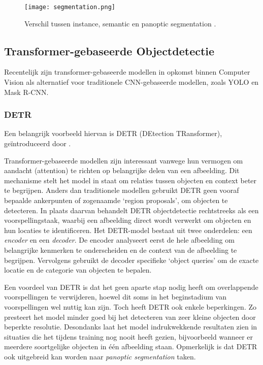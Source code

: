 \begin{figure}[H]
  \centering
  \texttt{[image: segmentation.png]}
  \caption[]{\label{fig:segmentation}
  Verschil tussen instance, semantic en panoptic segmentation \autocite{Kirillov2019}.
  }
\end{figure}

\subsection{Transformer-gebaseerde Objectdetectie}

Recentelijk zijn transformer-gebaseerde modellen in opkomst binnen Computer Vision als alternatief voor traditionele CNN-gebaseerde modellen, zoals YOLO en Mask R-CNN. 

\subsubsection{DETR}

Een belangrijk voorbeeld hiervan is DETR (DEtection TRansformer), geïntroduceerd door \textcite{Carion2020}.

Transformer-gebaseerde modellen zijn interessant vanwege hun vermogen om aandacht (attention) te richten op belangrijke delen van een afbeelding. 
Dit mechanisme stelt het model in staat om relaties tussen objecten en context beter te begrijpen.
Anders dan traditionele modellen gebruikt DETR geen vooraf bepaalde ankerpunten of zogenaamde `region proposals', om objecten te detecteren. 
In plaats daarvan behandelt DETR objectdetectie rechtstreeks als een voorspellingstaak, waarbij een afbeelding direct wordt verwerkt om objecten en hun locaties te identificeren.
Het DETR-model bestaat uit twee onderdelen: een \textit{encoder} en een \textit{decoder}. De encoder analyseert eerst de hele afbeelding om belangrijke kenmerken te onderscheiden en de context van de afbeelding te begrijpen. 
Vervolgens gebruikt de decoder specifieke `object queries' om de exacte locatie en de categorie van objecten te bepalen.

Een voordeel van DETR is dat het geen aparte stap nodig heeft om overlappende voorspellingen te verwijderen, hoewel dit soms in het beginstadium van voorspellingen wel nuttig kan zijn.
Toch heeft DETR ook enkele beperkingen. Zo presteert het model minder goed bij het detecteren van zeer kleine objecten door beperkte resolutie. 
Desondanks laat het model indrukwekkende resultaten zien in situaties die het tijdens training nog nooit heeft gezien, bijvoorbeeld wanneer er meerdere soortgelijke objecten in één afbeelding staan.
Opmerkelijk is dat DETR ook uitgebreid kan worden naar \textit{panoptic segmentation} taken.

